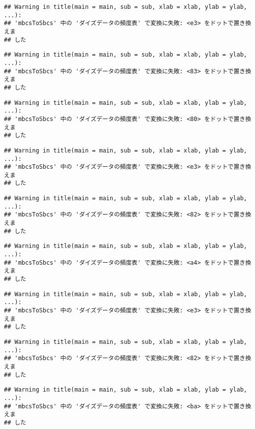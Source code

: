 \documentclass[
]{article}
\begin{document}
\begin{verbatim}
## Warning in title(main = main, sub = sub, xlab = xlab, ylab = ylab, ...):
## 'mbcsToSbcs' 中の 'ダイズデータの頻度表' で変換に失敗: <e3> をドットで置き換えま
## した
\end{verbatim}

\begin{verbatim}
## Warning in title(main = main, sub = sub, xlab = xlab, ylab = ylab, ...):
## 'mbcsToSbcs' 中の 'ダイズデータの頻度表' で変換に失敗: <83> をドットで置き換えま
## した
\end{verbatim}

\begin{verbatim}
## Warning in title(main = main, sub = sub, xlab = xlab, ylab = ylab, ...):
## 'mbcsToSbcs' 中の 'ダイズデータの頻度表' で変換に失敗: <80> をドットで置き換えま
## した
\end{verbatim}

\begin{verbatim}
## Warning in title(main = main, sub = sub, xlab = xlab, ylab = ylab, ...):
## 'mbcsToSbcs' 中の 'ダイズデータの頻度表' で変換に失敗: <e3> をドットで置き換えま
## した
\end{verbatim}

\begin{verbatim}
## Warning in title(main = main, sub = sub, xlab = xlab, ylab = ylab, ...):
## 'mbcsToSbcs' 中の 'ダイズデータの頻度表' で変換に失敗: <82> をドットで置き換えま
## した
\end{verbatim}

\begin{verbatim}
## Warning in title(main = main, sub = sub, xlab = xlab, ylab = ylab, ...):
## 'mbcsToSbcs' 中の 'ダイズデータの頻度表' で変換に失敗: <a4> をドットで置き換えま
## した
\end{verbatim}

\begin{verbatim}
## Warning in title(main = main, sub = sub, xlab = xlab, ylab = ylab, ...):
## 'mbcsToSbcs' 中の 'ダイズデータの頻度表' で変換に失敗: <e3> をドットで置き換えま
## した
\end{verbatim}

\begin{verbatim}
## Warning in title(main = main, sub = sub, xlab = xlab, ylab = ylab, ...):
## 'mbcsToSbcs' 中の 'ダイズデータの頻度表' で変換に失敗: <82> をドットで置き換えま
## した
\end{verbatim}

\begin{verbatim}
## Warning in title(main = main, sub = sub, xlab = xlab, ylab = ylab, ...):
## 'mbcsToSbcs' 中の 'ダイズデータの頻度表' で変換に失敗: <ba> をドットで置き換えま
## した
\end{verbatim}
\end{document}

